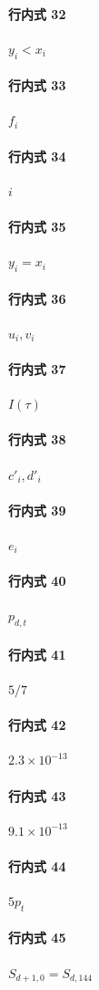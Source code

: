 \documentclass[12pt]{article}
\begin{document}
\paragraph{行内式 32}
\(y_i<x_i\)
\paragraph{行内式 33}
\(f_i\)
\paragraph{行内式 34}
\(i\)
\paragraph{行内式 35}
\(y_i=x_i\)
\paragraph{行内式 36}
\(u_i,v_i\)
\paragraph{行内式 37}
\(I(\tau)\)
\paragraph{行内式 38}
\(c'_i,d'_i\)
\paragraph{行内式 39}
\(e_i\)
\paragraph{行内式 40}
\(p_{d,t}\)
\paragraph{行内式 41}
\(5/7\)
\paragraph{行内式 42}
\(2.3\times10^{-13}\)
\paragraph{行内式 43}
\(9.1\times10^{-13}\)
\paragraph{行内式 44}
\(5p_t\)
\paragraph{行内式 45}
\(S_{d+1,0}=S_{d,144}\)
\end{document}
